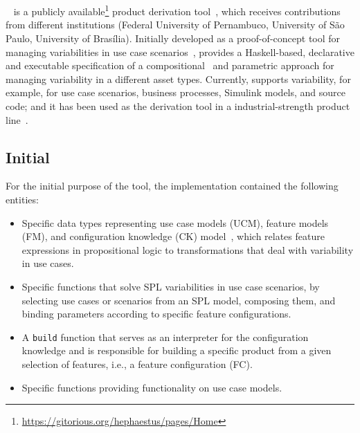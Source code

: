 
\section{\hp}
\label{sec:hephaestus}

\hp~\cite{rbonifacio:sbcars2009} is a publicly
available\footnote{\url{https://gitorious.org/hephaestus/pages/Home}}
product derivation tool~\cite{deelstra:2005}, which receives
contributions from different institutions (Federal University of
Pernambuco, University of S\~{a}o Paulo, University of
Bras\'{i}lia). Initially developed as a proof-of-concept tool for
managing variabilities in use case
scenarios~\cite{rbonifacio:aosd2009}, \hp{} provides a Haskell-based,
declarative and executable specification of a
compositional~\cite{kastner:2008} and parametric approach for managing
variability in a different asset types.  Currently, \hp{} supports
variability, for example, for use case scenarios, business processes,
Simulink models, and source code; and it has been used as the
derivation tool in a industrial-strength product
line~\cite{ferreira:2010}.


\subsection{Initial \hp}
\label{sec:initial-hp}

For the initial purpose of the tool, the implementation contained the
following entities:

\begin{itemize}
\item Specific data types representing use case models (UCM), feature
  models (FM), and configuration knowledge (CK) model~\cite{gpbook},
  which relates feature expressions in propositional logic to
  transformations that deal with variability in use cases.

\item Specific functions that solve SPL variabilities in use case
  scenarios, by selecting use cases or scenarios from an SPL model,
  composing them, and binding parameters according to specific feature
  configurations.

\item A \texttt{build} function that serves as an interpreter for the
  configuration knowledge and is responsible for building a specific
  product from a given selection of features, i.e., a feature
  configuration (FC).

\item Specific functions providing functionality on use case models.

\end{itemize}

